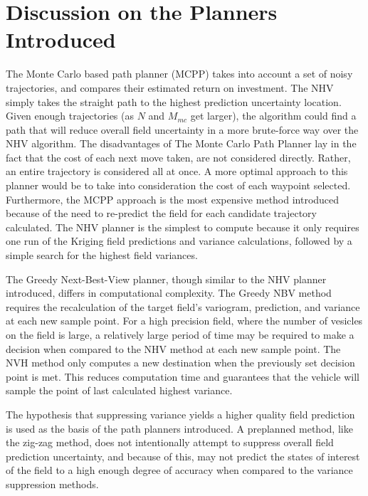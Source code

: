 \section{Discussion on the Planners Introduced}
The Monte Carlo based path planner (MCPP) takes into account a set of noisy trajectories, and compares their estimated return on investment. The NHV simply takes the straight path to the highest prediction uncertainty location. Given enough trajectories (as $N$ and $M_{mc}$ get larger), the algorithm could find a path that will reduce overall field uncertainty in a more brute-force way over the NHV algorithm. The disadvantages of The Monte Carlo Path Planner lay in the fact that the cost of each next move taken, are not considered directly. Rather, an entire trajectory is considered all at once. A more optimal approach to this planner would be to take into consideration the cost of each waypoint selected. Furthermore, the MCPP approach is the most expensive method introduced because of the need to re-predict the field for each candidate trajectory calculated. The NHV planner is the simplest to compute because it only requires one run of the Kriging field predictions and variance calculations, followed by a simple search for the highest field variances.

The Greedy Next-Best-View planner, though similar to the NHV planner introduced, differs in computational complexity. The Greedy NBV method requires the recalculation of the target field's variogram, prediction, and variance at each new sample point. For a high precision field, where the number of vesicles on the field is large, a relatively large period of time may be required to make a decision when compared to the NHV method at each new sample point. The NVH method only computes a new destination when the previously set decision point is met. This reduces computation time and guarantees that the vehicle will sample the point of last calculated highest variance.

The hypothesis that suppressing variance yields a higher quality field prediction is used as the basis of the path planners introduced. A preplanned method, like the zig-zag method, does not intentionally attempt to suppress overall field prediction uncertainty, and because of this, may not predict the states of interest of the field to a high enough degree of accuracy when compared to the variance suppression methods.